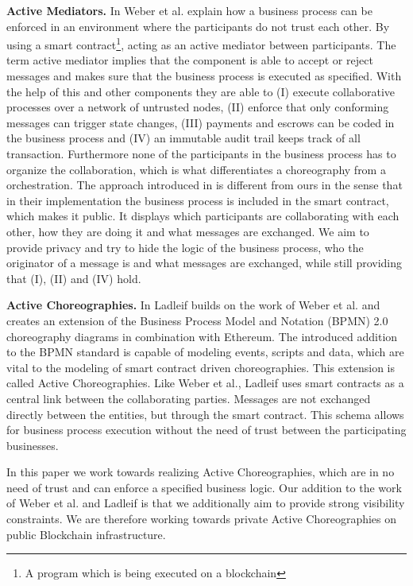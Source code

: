 \documentclass[runningheads]{llncs}
\begin{document}
\textbf{Active Mediators.} In \cite{weber2016untrusted} Weber et al. explain how a business process can be enforced in an environment where the participants do not trust each other. By using a smart contract\footnote{A program which is being executed on a blockchain}, acting as an active mediator between participants. The term active mediator implies that the component is able to accept or reject messages and makes sure that the business process is executed as specified. With the help of this and other components they are able to (I) execute collaborative processes over a network of untrusted nodes, (II) enforce that only conforming messages can trigger state changes, (III) payments and escrows can be coded in the business process and (IV) an immutable audit trail keeps track of all transaction. Furthermore none of the participants in the business process has to organize the collaboration, which is what differentiates a choreography from a orchestration. The approach introduced in \cite{weber2016untrusted} is different from ours in the sense that in their implementation the business process is included in the smart contract, which makes it public. It displays which participants are collaborating with each other, how they are doing it and what messages are exchanged. We aim to provide privacy and try to hide the logic of the business process, who the originator of a message is  and what messages are exchanged, while still providing that (I), (II) and (IV) hold.


\textbf{Active Choreographies.} In \cite{ladleif} Ladleif builds on the work of Weber et al. and creates an extension of the Business Process Model and Notation (BPMN) 2.0 choreography diagrams in combination with Ethereum. The introduced addition to the BPMN standard is capable of modeling events, scripts and data, which are vital to the modeling of smart contract driven choreographies. This extension is called Active Choreographies. Like   Weber et al., Ladleif uses smart contracts as a central link between the collaborating parties. Messages are not exchanged directly between the entities, but through the smart contract. This schema allows for business process execution without the need of trust between the participating businesses. 


In this paper we work towards realizing Active Choreographies, which are in no need of trust and can enforce a specified business logic. Our addition to the work of Weber et al. and Ladleif is that we additionally aim to provide strong visibility constraints. We are therefore working towards private Active Choreographies on public Blockchain infrastructure. 
\end{document}
